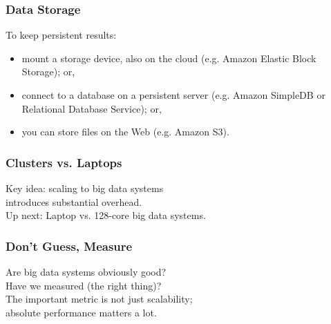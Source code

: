 
\begin{frame}
  \frametitle{Data Storage}
  
To keep persistent results:
\begin{itemize}
\item mount a storage device,
also on the cloud (e.g. Amazon Elastic Block Storage); or, 
\item connect to a database on a persistent server (e.g. Amazon SimpleDB or
Relational Database Service); or, 
\item you can store files on the Web (e.g. Amazon S3). 
\end{itemize}
  
\end{frame}


\begin{frame}
\frametitle{Clusters vs. Laptops}


\begin{changemargin}{1cm}
Key idea: scaling to big data systems \\
introduces substantial overhead. \\[1em]
Up next: Laptop vs. 128-core big data systems.
\end{changemargin}

\end{frame}



\begin{frame}
\frametitle{Don't Guess, Measure}


\begin{changemargin}{1cm}
Are big data systems obviously good?\\
Have we measured (the right thing)?\\[1em]

The important metric is not just scalability; \\
absolute performance matters a lot. 

\end{changemargin}

\end{frame}



